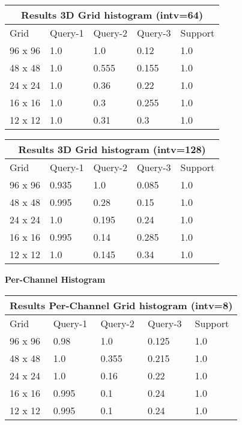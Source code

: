 \documentclass[12pt]{article}
\begin{document}
\begin{tabular}{ |p{1.5cm}||p{2cm}|p{2cm}|p{2cm}|p{2cm}|  }
    \hline
    \multicolumn{5}{|c|}{Results 3D Grid histogram (intv=64)} \\
    \hline
    Grid & Query-1 & Query-2 & Query-3 & Support \\
    \hline
    96 x 96 & 1.0 & 1.0 & 0.12 & 1.0 \\
    \hline
    48 x 48 & 1.0 & 0.555 & 0.155 & 1.0 \\
    \hline
    24 x 24 & 1.0 & 0.36 & 0.22 & 1.0 \\
    \hline
    16 x 16 & 1.0 & 0.3 & 0.255 & 1.0 \\
    \hline
    12 x 12 & 1.0 & 0.31 & 0.3 & 1.0 \\
    \hline
\end{tabular}

\begin{tabular}{ |p{1.5cm}||p{2cm}|p{2cm}|p{2cm}|p{2cm}|  }
    \hline
    \multicolumn{5}{|c|}{Results 3D Grid histogram (intv=128)} \\
    \hline
    Grid & Query-1 & Query-2 & Query-3 & Support \\
    \hline
    96 x 96 & 0.935 & 1.0 & 0.085 & 1.0 \\
    \hline
    48 x 48 & 0.995 & 0.28 & 0.15 & 1.0 \\
    \hline
    24 x 24 & 1.0 & 0.195 & 0.24 & 1.0 \\
    \hline
    16 x 16 & 0.995 & 0.14 & 0.285 & 1.0 \\
    \hline
    12 x 12 & 1.0 & 0.145 & 0.34 & 1.0 \\
    \hline
\end{tabular}

\pagebreak

\textbf{Per-Channel Histogram} \\ 

\begin{tabular}{ |p{1.5cm}||p{2cm}|p{2cm}|p{2cm}|p{2cm}|  }
    \hline
    \multicolumn{5}{|c|}{Results Per-Channel Grid histogram (intv=8)} \\
    \hline
    Grid & Query-1 & Query-2 & Query-3 & Support \\
    \hline
    96 x 96 & 0.98 & 1.0 & 0.125 & 1.0 \\
    \hline
    48 x 48 & 1.0 & 0.355 & 0.215 & 1.0 \\
    \hline
    24 x 24 & 1.0 & 0.16 & 0.22 & 1.0 \\
    \hline
    16 x 16 & 0.995 & 0.1 & 0.24 & 1.0 \\
    \hline
    12 x 12 & 0.995 & 0.1 & 0.24 & 1.0 \\
    \hline
\end{tabular}
\end{document}
